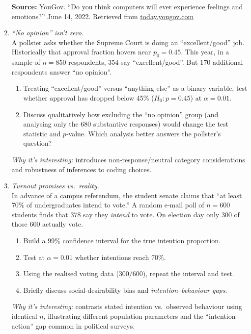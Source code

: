 \documentclass[11pt]{article}
\begin{document}
\begin{enumerate}[label=\textbf{Q\,\arabic*:}, left=0pt]
      \vspace{0.5em}
      \noindent\textbf{Source:} YouGov. “Do you think computers will ever experience feelings and emotions?” June 14, 2022. Retrieved from \href{https://today.yougov.com/}{today.yougov.com}

\item  \emph{ “No opinion” isn’t zero.}  \\
      A pollster asks whether the Supreme Court is doing an “excellent/good” job.
      Historically that approval fraction hovers near $p_0=0.45$.  
      This year, in a sample of $n=850$ respondents, $354$ say “excellent/good”.
      But $170$ additional respondents answer “no opinion”.
      \begin{enumerate}[label=(\alph*)]
         \item Treating “excellent/good” versus “anything else” as a binary variable, test whether approval has dropped below 45\% ($H_0{:}p=0.45$) at $\alpha=0.01$.  
         \item Discuss qualitatively how excluding the “no opinion” group (and analysing only the 680 substantive responses) would change the test statistic and $p$‑value.  Which analysis better answers the pollster’s question?
      \end{enumerate}
      \textit{Why it’s interesting:}  introduces non‑response/neutral category considerations and robustness of inferences to coding choices.  

\item  \emph{Turnout promises vs.\ reality.}  \\
      In advance of a campus referendum, the student senate claims that “at least 70\% of undergraduates intend to vote.”  
      A random e‑mail poll of $n=600$ students finds that $378$ say they \emph{intend} to vote.
      On election day only $300$ of those 600 actually vote.  
      \begin{enumerate}[label=(\alph*)]
         \item Build a 99\% confidence interval for the true intention proportion.  
         \item Test at $\alpha=0.01$ whether intentions reach 70\%.  
         \item Using the realised voting data ($300/600$), repeat the interval and test.  
         \item Briefly discuss social‑desirability bias and \emph{intention–behaviour gaps}.
      \end{enumerate}
      \textit{Why it’s interesting:}  contrasts stated intention vs.\ observed behaviour using identical $n$, illustrating different population parameters and the “intention–action” gap common in political surveys.  


\end{enumerate}
\end{document}
